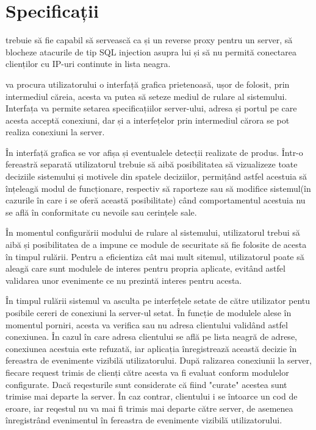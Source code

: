  \section{Specificații}
\textit{\thesistitle}  trebuie să fie capabil să servească ca și un reverse proxy pentru un server, să blocheze atacurile de tip SQL injection asupra lui și să nu permită conectarea clienților cu IP-uri continute in lista neagra. 

\textit{\thesistitle}  va procura utilizatorului o interfață grafica prietenoasă, ușor de folosit, prin intermediul căreia, acesta va putea să seteze mediul de rulare al sistemului. Interfața va permite setarea specificațiilor server-ului, adresa și portul pe care acesta acceptă conexiuni, dar și a interfețelor prin intermediul cărora se pot realiza conexiuni la server. 
  
În interfață grafica se vor afișa și eventualele detecții realizate de produs. Într-o fereastră separată utilizatorul trebuie să aibă posibilitatea să vizualizeze toate deciziile sistemului și motivele din spatele deciziilor, permițând astfel acestuia să înțeleagă modul de funcționare, respectiv să raporteze sau să modifice sistemul(în cazurile în care i se oferă această posibilitate) când comportamentul acestuia nu se află în conformitate cu nevoile sau cerințele sale. 

În momentul configurării modului de rulare al sistemului, utilizatorul trebui să aibă și posibilitatea de a impune ce module de securitate să fie folosite de acesta în timpul rulării. Pentru a eficientiza cât mai mult sitemul, utilizatorul poate să aleagă care sunt modulele de interes pentru propria aplicate, evitând astfel validarea unor evenimente ce nu prezintă interes pentru acesta. 

 
În timpul rulării sistemul va asculta pe interfețele setate de către utilizator pentu posibile cereri de conexiuni la server-ul setat. În funcție de modulele alese în momentul porniri, acesta va verifica sau nu adresa clientului validând astfel conexiunea. În cazul în care adresa clientului se află pe lista neagră de adrese, conexiunea acestuia este refuzată, iar aplicația înregistrează această decizie în fereastra de evenimente vizibilă utilizatorului. După ralizarea conexiunii la server, fiecare request trimis de clienți către acesta va fi evaluat conform modulelor configurate. Dacă reqesturile sunt considerate că fiind "curate" acestea sunt trimise mai departe la server. În caz contrar, clientului i se întoarce un cod de eroare, iar reqestul nu va mai fi trimis mai departe către server, de asemenea înregistrând evenimentul în fereastra de evenimente vizibilă utilizatorului. 


